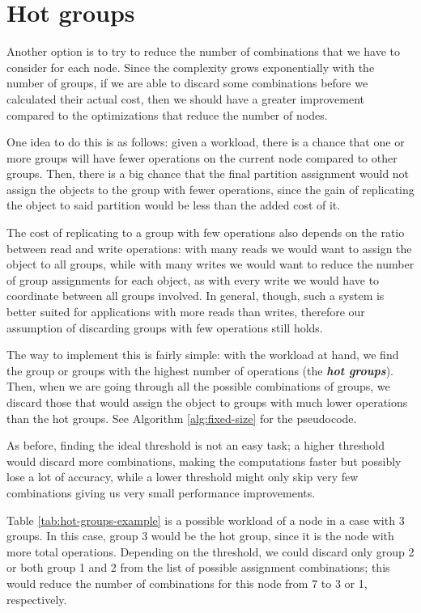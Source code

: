 \section{Hot groups}\label{sec:hot-groups}
Another option is to try to reduce the number of combinations that we have to consider for each node. Since the complexity grows exponentially with the number of groups, if we are able to discard some combinations before we calculated their actual cost, then we should have a greater improvement compared to the optimizations that reduce the number of nodes.

One idea to do this is as follows: given a workload, there is a chance that one or more groups will have fewer operations on the current node compared to other groups. Then, there is a big chance that the final partition assignment would not assign the objects to the group with fewer operations, since the gain of replicating the object to said partition would be less than the added cost of it.

The cost of replicating to a group with few operations also depends on the ratio between read and write operations: with many reads we would want to assign the object to all groups, while with many writes we would want to reduce the number of group assignments for each object, as with every write we would have to coordinate between all groups involved. In general, though, such a system is better suited for applications with more reads than writes, therefore our assumption of discarding groups with few operations still holds.

The way to implement this is fairly simple: with the workload at hand, we find the group or groups with the highest number of operations (the \textbf{\emph{hot groups}}). Then, when we are going through all the possible combinations of groups, we discard those that would assign the object to groups with much lower operations than the hot groups.  See Algorithm \ref{alg:fixed-size} for the pseudocode.

As before, finding the ideal threshold is not an easy task; a higher threshold would discard more combinations, making the computations faster but possibly lose a lot of accuracy, while a lower threshold might only skip very few combinations giving us very small performance improvements. 

Table \ref{tab:hot-groups-example} is a possible workload of a node in a case with 3 groups. In this case, group 3 would be the hot group, since it is the node with more total operations. Depending on the threshold, we could discard only group 2 or both group 1 and 2 from the list of possible assignment combinations; this would reduce the number of combinations for this node from 7 to 3 or 1, respectively.


